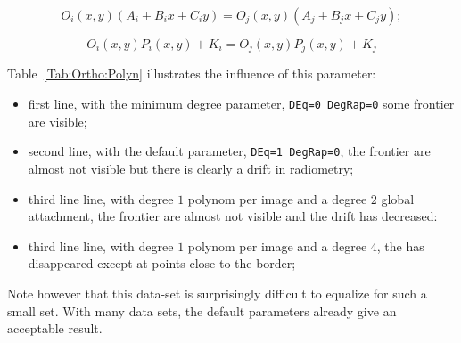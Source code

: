 \begin{equation}
O_i(x,y)(A_i+B_ix+C_iy)=O_j(x,y)(A_j+B_jx+C_jy);
\label{Eq:Rad:Mon}
\end{equation}

\begin{equation}
   O_i(x,y) P_i(x,y) + K_i = O_j(x,y) P_j(x,y) + K_j
\label{Eq:Rad:PolIndivCste}
\end{equation}

Table~\ref{Tab:Ortho:Polyn} illustrates the influence of this parameter:

\begin{itemize}
   \item first line, with the minimum degree parameter, {\tt DEq=0 DegRap=0} some
	 frontier are visible;
   \item second line, with the default parameter, {\tt DEq=1 DegRap=0}, the frontier
	 are almost not visible but there is clearly a drift in radiometry;
   \item third line line, with  degree $1$ polynom per image and a degree $2$ global
	 attachment, the frontier are almost not visible and the drift has decreased:
   \item third line line, with  degree $1$ polynom per image and a degree $4$, the
	 has disappeared except at points close to the border;
\end{itemize}

Note however that this data-set is surprisingly difficult to equalize for such a
small set. With many data sets, the default parameters already give an acceptable result.

